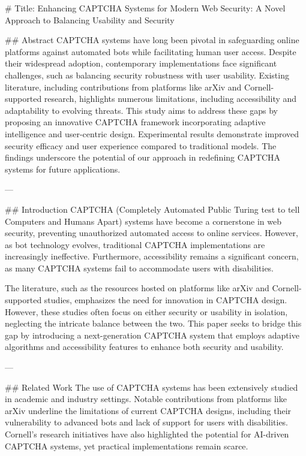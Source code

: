 # Title: Enhancing CAPTCHA Systems for Modern Web Security: A Novel Approach to Balancing Usability and Security

## Abstract
CAPTCHA systems have long been pivotal in safeguarding online platforms against automated bots while facilitating human user access. Despite their widespread adoption, contemporary implementations face significant challenges, such as balancing security robustness with user usability. Existing literature, including contributions from platforms like arXiv and Cornell-supported research, highlights numerous limitations, including accessibility and adaptability to evolving threats. This study aims to address these gaps by proposing an innovative CAPTCHA framework incorporating adaptive intelligence and user-centric design. Experimental results demonstrate improved security efficacy and user experience compared to traditional models. The findings underscore the potential of our approach in redefining CAPTCHA systems for future applications.

---

## Introduction
CAPTCHA (Completely Automated Public Turing test to tell Computers and Humans Apart) systems have become a cornerstone in web security, preventing unauthorized automated access to online services. However, as bot technology evolves, traditional CAPTCHA implementations are increasingly ineffective. Furthermore, accessibility remains a significant concern, as many CAPTCHA systems fail to accommodate users with disabilities. 

The literature, such as the resources hosted on platforms like arXiv and Cornell-supported studies, emphasizes the need for innovation in CAPTCHA design. However, these studies often focus on either security or usability in isolation, neglecting the intricate balance between the two. This paper seeks to bridge this gap by introducing a next-generation CAPTCHA system that employs adaptive algorithms and accessibility features to enhance both security and usability.

---

## Related Work
The use of CAPTCHA systems has been extensively studied in academic and industry settings. Notable contributions from platforms like arXiv underline the limitations of current CAPTCHA designs, including their vulnerability to advanced bots and lack of support for users with disabilities. Cornell's research initiatives have also highlighted the potential for AI-driven CAPTCHA systems, yet practical implementations remain scarce.

